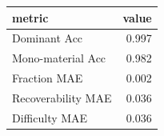 \begin{tabular}{lr}
\toprule
metric & value \\
\midrule
Dominant Acc & 0.997 \\
Mono-material Acc & 0.982 \\
Fraction MAE & 0.002 \\
Recoverability MAE & 0.036 \\
Difficulty MAE & 0.036 \\
\bottomrule
\end{tabular}
